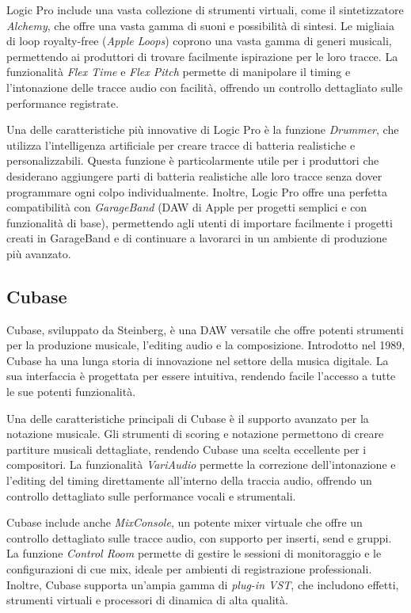 \documentclass{book}
\begin{document}
Logic Pro include una vasta collezione di strumenti virtuali, come il sintetizzatore \textit{Alchemy}, che offre una vasta gamma di suoni e possibilità di sintesi. Le migliaia di loop royalty-free (\textit{Apple Loops}) coprono una vasta gamma di generi musicali, permettendo ai produttori di trovare facilmente ispirazione per le loro tracce. La funzionalità \textit{Flex Time} e \textit{Flex Pitch} permette di manipolare il timing e l’intonazione delle tracce audio con facilità, offrendo un controllo dettagliato sulle performance registrate.

Una delle caratteristiche più innovative di Logic Pro è la funzione \textit{Drummer}, che utilizza l’intelligenza artificiale per creare tracce di batteria realistiche e personalizzabili. Questa funzione è particolarmente utile per i produttori che desiderano aggiungere parti di batteria realistiche alle loro tracce senza dover programmare ogni colpo individualmente. Inoltre, Logic Pro offre una perfetta compatibilità con \textit{GarageBand} (DAW di Apple per progetti semplici e con funzionalità di base), permettendo agli utenti di importare facilmente i progetti creati in GarageBand e di continuare a lavorarci in un ambiente di produzione più avanzato.

\subsection{Cubase}

Cubase, sviluppato da Steinberg, è una DAW versatile che offre potenti strumenti per la produzione musicale, l’editing audio e la composizione. Introdotto nel 1989, Cubase ha una lunga storia di innovazione nel settore della musica digitale. La sua interfaccia è progettata per essere intuitiva, rendendo facile l’accesso a tutte le sue potenti funzionalità.

Una delle caratteristiche principali di Cubase è il supporto avanzato per la notazione musicale. Gli strumenti di scoring e notazione permettono di creare partiture musicali dettagliate, rendendo Cubase una scelta eccellente per i compositori. La funzionalità \textit{VariAudio} permette la correzione dell’intonazione e l’editing del timing direttamente all’interno della traccia audio, offrendo un controllo dettagliato sulle performance vocali e strumentali.

Cubase include anche \textit{MixConsole}, un potente mixer virtuale che offre un controllo dettagliato sulle tracce audio, con supporto per inserti, send e gruppi. La funzione \textit{Control Room} permette di gestire le sessioni di monitoraggio e le configurazioni di cue mix, ideale per ambienti di registrazione professionali. Inoltre, Cubase supporta un’ampia gamma di \textit{plug-in VST}, che includono effetti, strumenti virtuali e processori di dinamica di alta qualità.
\end{document}
